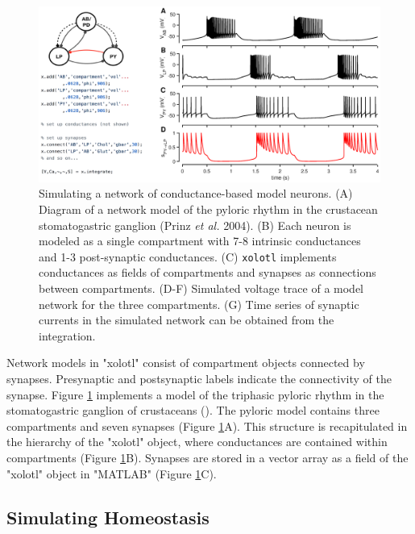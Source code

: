 \documentclass{frontiersSCNS} %
\begin{document}
\begin{figure}[!htb]
	\centering
	\includegraphics[width=1.0\linewidth]{gfx/figure_network}
	\caption{Simulating a network of conductance-based model neurons. (A) Diagram of a network model of the pyloric rhythm in the crustacean stomatogastric ganglion (Prinz \textit{et al.} 2004). (B) Each neuron is modeled as a single compartment with 7-8 intrinsic conductances and 1-3 post-synaptic conductances. (C) \texttt{xolotl} implements conductances as fields of compartments and synapses as connections between compartments. (D-F) Simulated voltage trace of a model network for the three compartments. (G) Time series of synaptic currents in the simulated network can be obtained from the integration.}
	\label{fig:figurenetwork}
\end{figure}

Network models in "xolotl" consist of compartment objects connected by synapses. Presynaptic and postsynaptic labels indicate the connectivity of the synapse. Figure \ref{fig:figurenetwork} implements a model of the triphasic pyloric rhythm in the stomatogastric ganglion of crustaceans (\cite{prinzSimilarNetworkActivity2004}). The pyloric model contains three compartments and seven synapses (Figure \ref{fig:figurenetwork}A). This structure is recapitulated in the hierarchy of the "xolotl" object, where conductances are contained within compartments (Figure \ref{fig:figurenetwork}B). Synapses are stored in a vector array as a field of the "xolotl" object in "MATLAB" (Figure \ref{fig:figurenetwork}C).

%
%
%
%
%
%

\subsection{Simulating Homeostasis}
\end{document}
